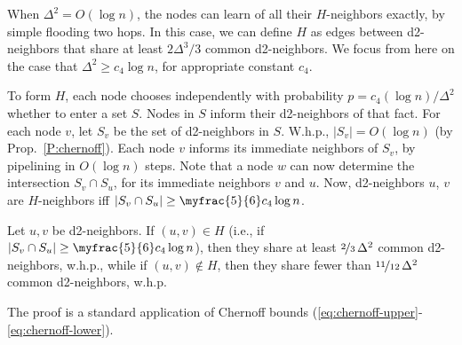 When $\Delta^2 = O(\log n)$, the nodes can learn of all their $H$-neighbors exactly, by simple flooding two hops. In this case, we can define $H$ as edges between d2-neighbors that share at least $2\Delta^3/3$ common d2-neighbors. We focus from here on the case that $\Delta^2 \ge c_4\log n$, for appropriate constant $c_4$.

To form $H$, each node chooses independently with probability $p = c_4(\log n)/\Delta^2$ whether to enter a set $S$. Nodes in $S$ inform their d2-neighbors of that fact. For each node $v$, let $S_v$ be the set of d2-neighbors in $S$. W.h.p., $|S_v| = O(\log n)$ (by Prop.~\ref{P:chernoff}). Each node $v$ informs its immediate neighbors of $S_v$, by pipelining in $O(\log n)$ steps.
Note that a node $w$ can now determine the intersection $S_v \cap S_u$, for its immediate neighbors $v$ and $u$.
Now, d2-neighbors $u$, $v$ are $H$-neighbors iff $|S_v \cap S_u| \ge \myfrac{5}{6} c_4 \log n$. 
\begin{theorem}
Let $u,v$ be d2-neighbors. 
If $(u,v) \in H$ (i.e., if $|S_v \cap S_u| \ge \myfrac{5}{6} c_4 \log n$), then they share at least $\nicefrac{2}{3}\, \Delta^2$ common d2-neighbors, w.h.p.,
while if $(u,v) \not\in H$, then they share fewer than $\nicefrac{11}{12}\, \Delta^2$ common d2-neighbors, w.h.p.
\label{T:similarity}
\end{theorem}
The proof is a standard application of Chernoff bounds (\ref{eq:chernoff-upper}-\ref{eq:chernoff-lower}).
